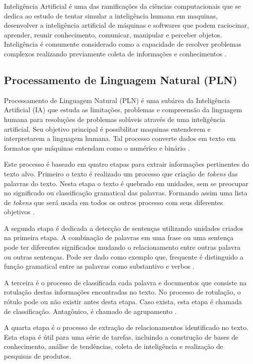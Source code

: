 Inteligência Artificial é uma das ramificações da ciências computacionais que se dedica ao estudo de tentar simular a inteligência humana em maquinas, desenvolver a inteligência artificial de máquinas e softwares que podem raciocinar, aprender, reunir conhecimento, comunicar, manipular e perceber objetos. Inteligência é comumente considerado como a capacidade de resolver problemas complexos realizando previamente coleta de informações e conhecimentos \cite{Pannu:2015}.

\noindent {}

\subsection{Processamento de Linguagem Natural (PLN)} Processamento de Linguagem Natural (PLN) é uma subárea da Inteligência Artificial (IA) que estuda as limitações, problemas e compreensão da linguagem humana para resoluções de problemas solúveis através de uma inteligência artificial.  Seu objetivo principal é possibilitar maquinas entenderem e interpretarem a linguagem humana. Tal processo converte dados em texto em formatos que máquinas entendam como o numérico e binário \cite{Kulkarni:2019}.

Este processo é baseado em quatro etapas para extrair informações pertinentes do texto alvo. Primeiro o texto é realizado um processo que criação de \textit{tokens} das palavras do texto. Nesta etapa o texto é quebrado em unidades, sem se preocupar no significado ou classificação gramatical das palavras. Formando assim uma lista de \textit{tokens} que será usada em todos os outros processo com seus diferentes objetivos \cite{Reese:2015}.

A segunda etapa é dedicada a detecção de sentenças utilizando unidades criados na primeira etapa. A combinação de palavras em uma frase ou uma sentença pode ter diferentes significados mudando o relacionamento entre outras palavra ou outras sentenças. Pode ser dado como exemplo que, frequente é distinguido a função gramatical entre as palavras como substantivo e verbos \cite{Reese:2015}.

A terceira é o processo de classificada cada palavra e documentos que consiste na rotulação destas informações encontradas no texto. No processo de rotulação, o rótulo pode ou não existir antes desta etapa. Caso exista, esta etapa é chamada de classificação. Antagônico, é chamado de agrupamento \cite{Reese:2015}.

A quarta etapa é o processo de extração de relacionamentos identificado no texto. Esta etapa é útil para uma série de tarefas, incluindo a construção de bases de conhecimento, análise de tendências, coleta de inteligência e realização de pesquisas de produtos.
